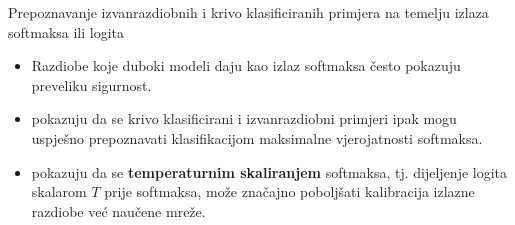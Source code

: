 \documentclass{beamer}
\begin{document}
\begin{frame}{Prepoznavanje izvanrazdiobnih i krivo klasificiranih primjera na temelju izlaza softmaksa ili logita}
\begin{itemize}
	\item Razdiobe koje duboki modeli daju kao izlaz softmaksa često pokazuju preveliku sigurnost.
	\item \citet{Hendrycks:2016:BDMOODE} pokazuju da se krivo klasificirani i izvanrazdiobni primjeri ipak mogu uspješno prepoznavati klasifikacijom maksimalne vjerojatnosti softmaksa. 
	\item \citet{Guo:2017:CMNN} pokazuju da se \textbf{temperaturnim skaliranjem} softmaksa, tj. dijeljenje logita skalarom $T$ prije softmaksa, može značajno poboljšati kalibracija izlazne razdiobe već naučene mreže.
\end{itemize}
\end{frame}
\end{document}
